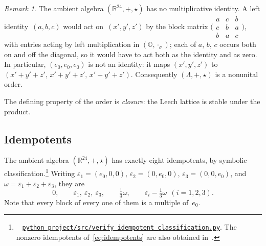 \documentclass[twoside,english]{paper}
\numberwithin{equation}{section}
\numberwithin{figure}{section}
\theoremstyle{definition}
\theoremstyle{remark}
\newtheorem{remark}[theorem]{Remark}
\newcommand{\OO}{\mathbb{O}}          %
\newcommand{\RR}{\mathbb{R}}
\newcommand{\LL}{\Lambda}             %
\newcommand{\scriptref}[1]{\cite{repo}~%
  \href{https://github.com/koeplinger/leech\_alg/blob/main/python\_project/src/#1}%
  {\nolinkurl{python_project/src/#1}}}
\begin{document}
\begin{remark}\label{rem:no-identity}
The ambient algebra $(\RR^{24}, +, \star)$ has no multiplicative
identity.  A left identity~$(a,b,c)$ would act on~$(x',y',z')$ by the
block matrix
$\bigl(\begin{smallmatrix} a & c & b \\ c & b & a \\ b & a & c
\end{smallmatrix}\bigr)$, with entries acting by left multiplication
in $(\OO, \cdot_\sigma)$; each of $a$, $b$, $c$ occurs both on and off
the diagonal, so it would have to act both as the identity and as
zero.  In particular, $(e_0, e_0, e_0)$ is
not an identity: it maps $(x', y', z')$ to $(x'+y'+z',\, x'+y'+z',\,
x'+y'+z')$.  Consequently $(\LL, +, \star)$ is a nonunital order.
\end{remark}

The defining property of the order is \emph{closure}: the Leech
lattice is stable under the product.

\subsection{Idempotents}\label{sec:idempotents}

The ambient algebra $(\RR^{24}, +, \star)$ has exactly eight
idempotents, by symbolic
classification.\footnote{\scriptref{verify\_idempotent\_classification.py}.
The nonzero idempotents of~\eqref{eq:idempotents} are also obtained
in~\cite{Petersson2026}.}
Writing $\varepsilon_1 = (e_0, 0, 0)$, $\varepsilon_2 = (0, e_0, 0)$,
$\varepsilon_3 = (0, 0, e_0)$, and $\omega = \varepsilon_1 +
\varepsilon_2 + \varepsilon_3$, they are
\begin{equation}\label{eq:idempotents}
  0, \qquad \varepsilon_1, \ \varepsilon_2, \ \varepsilon_3, \qquad
  \tfrac13 \omega, \qquad
  \varepsilon_i - \tfrac13 \omega \ \ (i = 1, 2, 3).
\end{equation}
Note that every block of every one of them is a multiple of~$e_0$.
\end{document}
